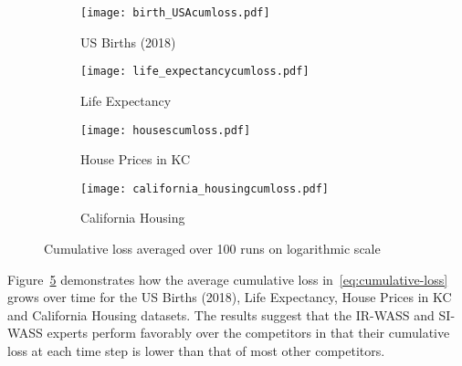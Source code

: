 \documentclass{article}
\begin{document}
    \begin{figure}
     \centering
     \begin{subfigure}[b]{0.45\textwidth}
         \centering
         \texttt{[image: birth\_USAcumloss.pdf]}
         \caption{US Births (2018)}
         \label{fig:us_births}
     \end{subfigure}\hfill
     \begin{subfigure}[b]{0.45\textwidth}
         \centering
         \texttt{[image: life\_expectancycumloss.pdf]}
         \caption{Life Expectancy}
         \label{fig:life_exp}
     \end{subfigure}\hfill
     \begin{subfigure}[b]{0.45\textwidth}
         \centering
         \texttt{[image: housescumloss.pdf]}
         \caption{House Prices in KC}
         \label{fig:houses}
     \end{subfigure}\hfill
     \begin{subfigure}[b]{0.45\textwidth}
         \centering
         \texttt{[image: california\_housingcumloss.pdf]}
         \caption{California Housing}
         \label{fig:california_housing}
     \end{subfigure}\hfill
        \caption{Cumulative loss averaged over 100 runs on logarithmic scale}
        \label{fig:cum_loss_all}
\end{figure}
Figure~\ref{fig:cum_loss_all} demonstrates how the average cumulative loss in~\eqref{eq:cumulative-loss} grows over time for the US Births (2018), Life Expectancy, House Prices in KC and California Housing datasets. 
The results suggest that the IR-WASS and SI-WASS experts perform favorably over the competitors in that their cumulative loss at each time step is lower than that of most other competitors.  
% 
% 
\end{document}
